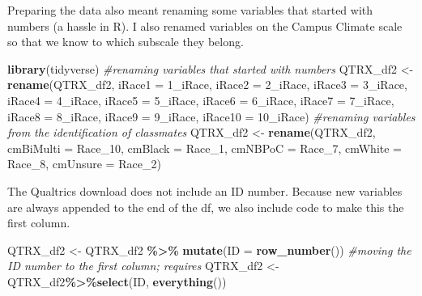 \documentclass[
  11pt,
]{book}
\newenvironment{Shaded}{\begin{snugshade}}{\end{snugshade}}
\newcommand{\AttributeTok}[1]{\textcolor[rgb]{0.27,0.27,0.27}{#1}}
\newcommand{\CommentTok}[1]{\textcolor[rgb]{0.37,0.37,0.37}{\textit{#1}}}
\newcommand{\FunctionTok}[1]{\textcolor[rgb]{0.27,0.27,0.27}{\textbf{#1}}}
\newcommand{\NormalTok}[1]{#1}
\newcommand{\OtherTok}[1]{\textcolor[rgb]{0.37,0.37,0.37}{#1}}
\newcommand{\SpecialCharTok}[1]{\textcolor[rgb]{0.43,0.43,0.43}{\textbf{#1}}}
\newcommand{\StringTok}[1]{\textcolor[rgb]{0.5,0.5,0.5}{#1}}
\begin{document}
Preparing the data also meant renaming some variables that started with numbers (a hassle in R). I also renamed variables on the Campus Climate scale so that we know to which subscale they belong.

\begin{Shaded}
\begin{Highlighting}[]
\FunctionTok{library}\NormalTok{(tidyverse)}
\CommentTok{\#renaming variables that started with numbers}
\NormalTok{QTRX\_df2 }\OtherTok{\textless{}{-}} \FunctionTok{rename}\NormalTok{(QTRX\_df2, }\AttributeTok{iRace1 =} \StringTok{\textquotesingle{}1\_iRace\textquotesingle{}}\NormalTok{, }\AttributeTok{iRace2 =} \StringTok{\textquotesingle{}2\_iRace\textquotesingle{}}\NormalTok{, }\AttributeTok{iRace3 =} \StringTok{\textquotesingle{}3\_iRace\textquotesingle{}}\NormalTok{, }\AttributeTok{iRace4 =} \StringTok{\textquotesingle{}4\_iRace\textquotesingle{}}\NormalTok{, }\AttributeTok{iRace5 =} \StringTok{\textquotesingle{}5\_iRace\textquotesingle{}}\NormalTok{, }\AttributeTok{iRace6 =} \StringTok{\textquotesingle{}6\_iRace\textquotesingle{}}\NormalTok{, }\AttributeTok{iRace7 =} \StringTok{\textquotesingle{}7\_iRace\textquotesingle{}}\NormalTok{, }\AttributeTok{iRace8 =} \StringTok{\textquotesingle{}8\_iRace\textquotesingle{}}\NormalTok{, }\AttributeTok{iRace9 =} \StringTok{\textquotesingle{}9\_iRace\textquotesingle{}}\NormalTok{, }\AttributeTok{iRace10 =} \StringTok{\textquotesingle{}10\_iRace\textquotesingle{}}\NormalTok{)}
\CommentTok{\#renaming variables from the identification of classmates}
\NormalTok{QTRX\_df2 }\OtherTok{\textless{}{-}} \FunctionTok{rename}\NormalTok{(QTRX\_df2, }\AttributeTok{cmBiMulti =}\NormalTok{ Race\_10, }\AttributeTok{cmBlack =}\NormalTok{ Race\_1, }\AttributeTok{cmNBPoC =}\NormalTok{ Race\_7, }\AttributeTok{cmWhite =}\NormalTok{ Race\_8, }\AttributeTok{cmUnsure =}\NormalTok{ Race\_2)}
\end{Highlighting}
\end{Shaded}

The Qualtrics download does not include an ID number. Because new variables are always appended to the end of the df, we also include code to make this the first column.

\begin{Shaded}
\begin{Highlighting}[]
\NormalTok{QTRX\_df2 }\OtherTok{\textless{}{-}}\NormalTok{ QTRX\_df2 }\SpecialCharTok{\%\textgreater{}\%} \FunctionTok{mutate}\NormalTok{(}\AttributeTok{ID =} \FunctionTok{row\_number}\NormalTok{())}
\CommentTok{\#moving the ID number to the first column; requires }
\NormalTok{QTRX\_df2 }\OtherTok{\textless{}{-}}\NormalTok{ QTRX\_df2}\SpecialCharTok{\%\textgreater{}\%}\FunctionTok{select}\NormalTok{(ID, }\FunctionTok{everything}\NormalTok{())}
\end{Highlighting}
\end{Shaded}
\end{document}
